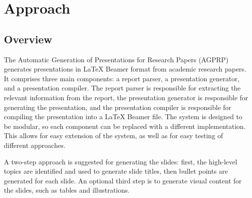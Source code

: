 \chapter{Approach}
\label{ch:approach}


\section{Overview}

The Automatic Generation of Presentations for Research Papers (AGPRP) generates presentations in \LaTeX{} Beamer format from academic research papers. It comprises three main components: a report parser, a presentation generator, and a presentation compiler. The report parser is responsible for extracting the relevant information from the report, the presentation generator is responsible for generating the presentation, and the presentation compiler is responsible for compiling the presentation into a \LaTeX{} Beamer file. The system is designed to be modular, so each component can be replaced with a different implementation. This allows for easy extension of the system, as well as for easy testing of different approaches.

A two-step approach is suggested for generating the slides: first, the high-level topics are identified and used to generate slide titles, then bullet points are generated for each slide. An optional third step is to generate visual content for the slides, such as tables and illustrations.

